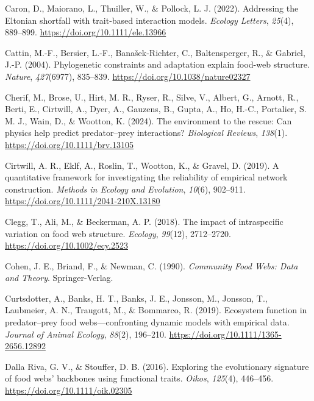 \documentclass[
]{article}
\newlength{\cslhangindent}
\newenvironment{CSLReferences}[2] %
 {\begin{list}{}{%
  \setlength{\itemindent}{0pt}
  \setlength{\leftmargin}{0pt}
  \setlength{\parsep}{0pt}
  \ifodd #1
   \setlength{\leftmargin}{\cslhangindent}
   \setlength{\itemindent}{-1\cslhangindent}
  \fi
  \setlength{\itemsep}{#2\baselineskip}}}
 {\end{list}}
\begin{document}
\begin{CSLReferences}{1}{0}
Caron, D., Maiorano, L., Thuiller, W., \& Pollock, L. J. (2022).
Addressing the {Eltonian} shortfall with trait-based interaction models.
\emph{Ecology Letters}, \emph{25}(4), 889--899.
\url{https://doi.org/10.1111/ele.13966}

Cattin, M.-F., Bersier, L.-F., Banašek-Richter, C., Baltensperger, R.,
\& Gabriel, J.-P. (2004). Phylogenetic constraints and adaptation
explain food-web structure. \emph{Nature}, \emph{427}(6977), 835--839.
\url{https://doi.org/10.1038/nature02327}

Cherif, M., Brose, U., Hirt, M. R., Ryser, R., Silve, V., Albert, G.,
Arnott, R., Berti, E., Cirtwill, A., Dyer, A., Gauzens, B., Gupta, A.,
Ho, H.-C., Portalier, S. M. J., Wain, D., \& Wootton, K. (2024). The
environment to the rescue: Can physics help predict predator--prey
interactions? \emph{Biological Reviews}, \emph{138}(1).
\url{https://doi.org/10.1111/brv.13105}

Cirtwill, A. R., Eklf, A., Roslin, T., Wootton, K., \& Gravel, D.
(2019). A quantitative framework for investigating the reliability of
empirical network construction. \emph{Methods in Ecology and Evolution},
\emph{10}(6), 902--911. \url{https://doi.org/10.1111/2041-210X.13180}

Clegg, T., Ali, M., \& Beckerman, A. P. (2018). The impact of
intraspecific variation on food web structure. \emph{Ecology},
\emph{99}(12), 2712--2720. \url{https://doi.org/10.1002/ecy.2523}

Cohen, J. E., Briand, F., \& Newman, C. (1990). \emph{Community {Food
Webs}: {Data} and {Theory}}. Springer-Verlag.

Curtsdotter, A., Banks, H. T., Banks, J. E., Jonsson, M., Jonsson, T.,
Laubmeier, A. N., Traugott, M., \& Bommarco, R. (2019). Ecosystem
function in predator--prey food webs---confronting dynamic models with
empirical data. \emph{Journal of Animal Ecology}, \emph{88}(2),
196--210. \url{https://doi.org/10.1111/1365-2656.12892}

Dalla Riva, G. V., \& Stouffer, D. B. (2016). Exploring the evolutionary
signature of food webs' backbones using functional traits. \emph{Oikos},
\emph{125}(4), 446--456. \url{https://doi.org/10.1111/oik.02305}


\end{CSLReferences}
\end{document}
